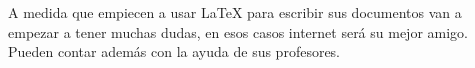 \documentclass[a4paper,12pt]{article}
\begin{document}
A medida que empiecen a usar \LaTeX{} para escribir sus documentos van a empezar a
tener muchas dudas, en esos casos internet será su mejor amigo. Pueden contar
además con la ayuda de sus profesores.

\newpage

\tableofcontents

\newpage

\end{document}
